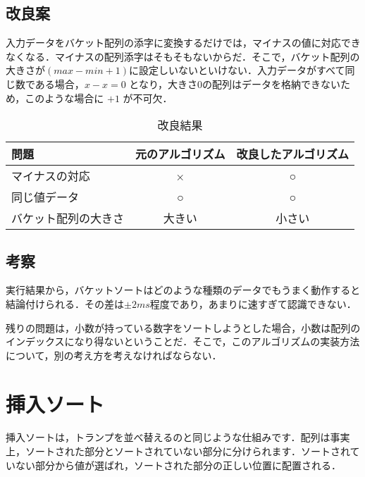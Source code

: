 \documentclass[a4j, titlepage]{jarticle}
\begin{document}
        \subsection{改良案}
            入力データをバケット配列の添字に変換するだけでは，マイナスの値に対応できなくなる．マイナスの配列添字はそもそもないからだ．そこで，バケット配列の大きさが$(max - min + 1)$に設定しいないといけない．入力データがすべて同じ数である場合，$ x - x = 0 $ となり，大きさ0の配列はデータを格納できないため，このような場合に $+ 1$ が不可欠．
            \begin{table}[tbh]
                \caption{改良結果}
                \label{tab:bucket_problem}
                \begin{center}
                    \begin{tabular}{|l|c|c|}
                        \hline
                        問題 & 元のアルゴリズム & 改良したアルゴリズム\\ \hline
                        マイナスの対応 & × & ○\\ \hline
                        同じ値データ & ○ & ○\\ \hline
                        バケット配列の大きさ & 大きい & 小さい\\ \hline
                    \end{tabular}
                \end{center}
            \end{table}

        \subsection{考察}
            実行結果から，バケットソートはどのような種類のデータでもうまく動作すると結論付けられる．その差は$\pm 2 ms$程度であり，あまりに速すぎて認識できない．

            残りの問題は，小数が持っている数字をソートしようとした場合，小数は配列のインデックスになり得ないということだ．そこで，このアルゴリズムの実装方法について，別の考え方を考えなければならない．


    \section{挿入ソート}
        挿入ソートは，トランプを並べ替えるのと同じような仕組みです．配列は事実上，ソートされた部分とソートされていない部分に分けられます．ソートされていない部分から値が選ばれ，ソートされた部分の正しい位置に配置される．
\end{document}
